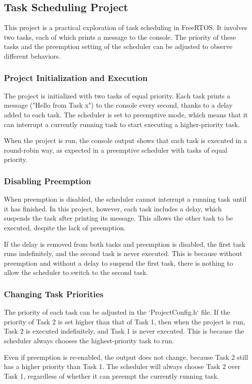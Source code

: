 \subsection{Task Scheduling Project}

This project is a practical exploration of task scheduling in FreeRTOS. It involves two tasks, each of which prints a message to the console. The priority of these tasks and the preemption setting of the scheduler can be adjusted to observe different behaviors.

\subsubsection{Project Initialization and Execution}

The project is initialized with two tasks of equal priority. Each task prints a message ("Hello from Task x") to the console every second, thanks to a delay added to each task. The scheduler is set to preemptive mode, which means that it can interrupt a currently running task to start executing a higher-priority task.

When the project is run, the console output shows that each task is executed in a round-robin way, as expected in a preemptive scheduler with tasks of equal priority.

\subsubsection{Disabling Preemption}

When preemption is disabled, the scheduler cannot interrupt a running task until it has finished. In this project, however, each task includes a delay, which suspends the task after printing its message. This allows the other task to be executed, despite the lack of preemption.

If the delay is removed from both tasks and preemption is disabled, the first task runs indefinitely, and the second task is never executed. This is because without preemption and without a delay to suspend the first task, there is nothing to allow the scheduler to switch to the second task.

\subsubsection{Changing Task Priorities}

The priority of each task can be adjusted in the `ProjectConfig.h` file. If the priority of Task 2 is set higher than that of Task 1, then when the project is run, Task 2 is executed indefinitely, and Task 1 is never executed. This is because the scheduler always chooses the highest-priority task to run.

Even if preemption is re-enabled, the output does not change, because Task 2 still has a higher priority than Task 1. The scheduler will always choose Task 2 over Task 1, regardless of whether it can preempt the currently running task.